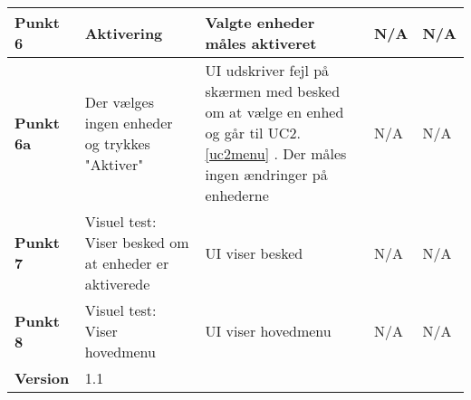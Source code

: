 \begin{center}
\begin{longtable}{|p{}|p{}|p{3cm}|p{3cm}|p{3cm}|}
\textbf{Punkt 6}		&Aktivering			
					&Valgte enheder måles aktiveret
					&N/A 
					&N/A \\\hline
															
\textbf{Punkt 6a}	&Der vælges ingen enheder og trykkes "Aktiver"				
					&UI udskriver fejl på skærmen med besked om at vælge en enhed og går til UC2.\ref{uc2menu}	. 
					 Der måles ingen ændringer på enhederne
					&N/A 
					&N/A \\\hline
		
\textbf{Punkt 7}		&Visuel test: Viser besked om at enheder er aktiverede
					&UI viser besked
					&N/A
					&N/A \\\hline
					
\textbf{Punkt 8}		&Visuel test: Viser hovedmenu
					&UI viser hovedmenu
					&N/A
					&N/A \\\hline

\textbf{Version}		&\multicolumn{4}{l|}{1.1} \\ \hline
															
	\end{longtable}
	\label{ATUC2} 
\end{center}